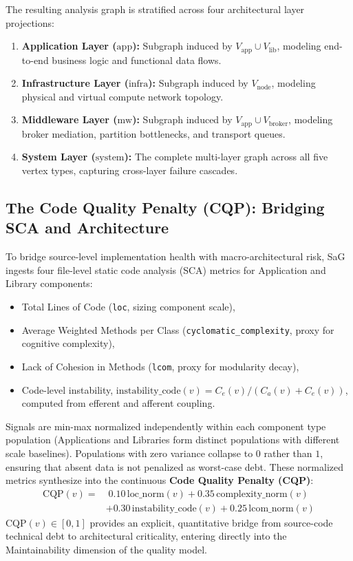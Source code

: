The resulting analysis graph is stratified across four architectural layer projections:
\begin{enumerate}
    \item \textbf{Application Layer ($\text{app}$):} Subgraph induced by $V_{\text{app}} \cup V_{\text{lib}}$, modeling end-to-end business logic and functional data flows.
    \item \textbf{Infrastructure Layer ($\text{infra}$):} Subgraph induced by $V_{\text{node}}$, modeling physical and virtual compute network topology.
    \item \textbf{Middleware Layer ($\text{mw}$):} Subgraph induced by $V_{\text{app}} \cup V_{\text{broker}}$, modeling broker mediation, partition bottlenecks, and transport queues.
    \item \textbf{System Layer ($\text{system}$):} The complete multi-layer graph across all five vertex types, capturing cross-layer failure cascades.
\end{enumerate}

\subsection{The Code Quality Penalty (CQP): Bridging SCA and Architecture}
\label{sec:model:cqp}

To bridge source-level implementation health with macro-architectural risk, SaG ingests four file-level static code analysis (SCA) metrics for Application and Library components:
\begin{itemize}
    \item Total Lines of Code (\texttt{loc}, sizing component scale),
    \item Average Weighted Methods per Class (\texttt{cyclomatic\_complexity}, proxy for cognitive complexity),
    \item Lack of Cohesion in Methods (\texttt{lcom}, proxy for modularity decay),
    \item Code-level instability, $\text{instability\_code}(v) = C_e(v) / (C_a(v) + C_e(v))$, computed from efferent and afferent coupling.
\end{itemize}

Signals are min-max normalized independently within each component type population (Applications and Libraries form distinct populations with different scale baselines). Populations with zero variance collapse to $0$ rather than $1$, ensuring that absent data is not penalized as worst-case debt. These normalized metrics synthesize into the continuous \textbf{Code Quality Penalty (CQP)}:
\begin{equation}
\begin{aligned}
\mathrm{CQP}(v) = & \; 0.10\,\text{loc\_norm}(v) + 0.35\,\text{complexity\_norm}(v) \\
                  & + 0.30\,\text{instability\_code}(v) + 0.25\,\text{lcom\_norm}(v)
\end{aligned}
\end{equation}
$\mathrm{CQP}(v) \in [0,1]$ provides an explicit, quantitative bridge from source-code technical debt to architectural criticality, entering directly into the Maintainability dimension of the quality model.

